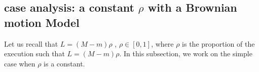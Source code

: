 \documentclass[11pt]{article}
\theoremstyle{plain}
\numberwithin{equation}{section}
\begin{document}
{{%
%
%
%
%
%
%
%
%
%
%
%
%
%
%
%
%

\subsection{case analysis: a constant $\rho$ with a Brownian motion Model}
Let us recall that { $L=(M-m)\rho$ }, $\rho\in [0,1]$, where $\rho$ is the proportion of the execution such that $L=(M-m)\rho$. In this subsection, we work on the simple case when $\rho$ is a constant. 
{

}}}
\end{document}
